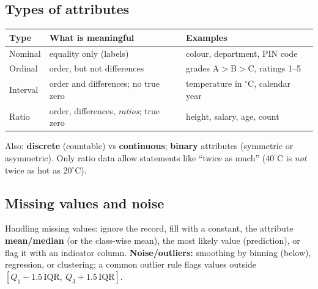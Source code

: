 \documentclass[11pt,a4paper]{article}
\begin{document}
\subsection{Types of attributes}
\begin{center}
\small
\begin{tabularx}{\textwidth}{>{\raggedright\arraybackslash}p{2.6cm}>{\raggedright\arraybackslash}p{4.2cm}>{\raggedright\arraybackslash}X}
\toprule
\textbf{Type} & \textbf{What is meaningful} & \textbf{Examples}\\
\midrule
Nominal & equality only (labels) & colour, department, PIN code\\
Ordinal & order, but not differences & grades A$>$B$>$C, ratings 1--5\\
Interval & order and differences; no true zero & temperature in $^\circ$C, calendar year\\
Ratio & order, differences, \emph{ratios}; true zero & height, salary, age, count\\
\bottomrule
\end{tabularx}
\end{center}
Also: \textbf{discrete} (countable) vs \textbf{continuous}; \textbf{binary} attributes (symmetric or asymmetric). Only ratio data allow statements like ``twice as much'' ($40^\circ$C is \emph{not} twice as hot as $20^\circ$C).

\subsection{Missing values and noise}
Handling missing values: ignore the record, fill with a constant, the attribute \textbf{mean/median} (or the class-wise mean), the most likely value (prediction), or flag it with an indicator column. \textbf{Noise/outliers:} smoothing by binning (below), regression, or clustering; a common outlier rule flags values outside $[Q_1-1.5\,\mathrm{IQR},\ Q_3+1.5\,\mathrm{IQR}]$.
\end{document}
